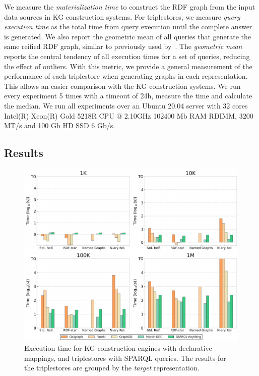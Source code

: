 We measure the \textit{materialization time} to construct the RDF graph from the input data sources in KG construction systems.
For triplestores, we measure \textit{query execution time} as the total time from query execution until the complete answer is generated. 
We also report the geometric mean of all queries that generate the same reified RDF graph, similar to previously used by~\citep{morsey2011dbpedia,schmidt2009sp}. 
The \textit{geometric mean} reports the central tendency of all execution times for a set of queries, reducing the effect of outliers. 
With this metric, we provide a general measurement of the performance of each triplestore when generating graphs in each representation. 
This allows an easier comparison with the KG construction systems. 
We run every experiment 5 times with a timeout of 24h, measure the time and calculate the median.
We run all experiments over an Ubuntu 20.04 server with
32 cores Intel(R) Xeon(R) Gold 5218R CPU @ 2.10GHz
102400 Mb RAM RDIMM, 3200 MT/s and 
100 Gb HD SSD 6 Gb/s. 




\subsection{Results}
\label{sec:chp6-1_results}


\begin{figure}[t!]
    \centering
    \includegraphics[width=\linewidth]{figures/chp6-1_results-map-queries.pdf}
    \caption{Execution time for KG construction engines with declarative mappings, and triplestores with SPARQL queries. The results for the triplestores are grouped by the \textit{target} representation.}
    \label{fig:chp6-1_map-queries}
\end{figure}




